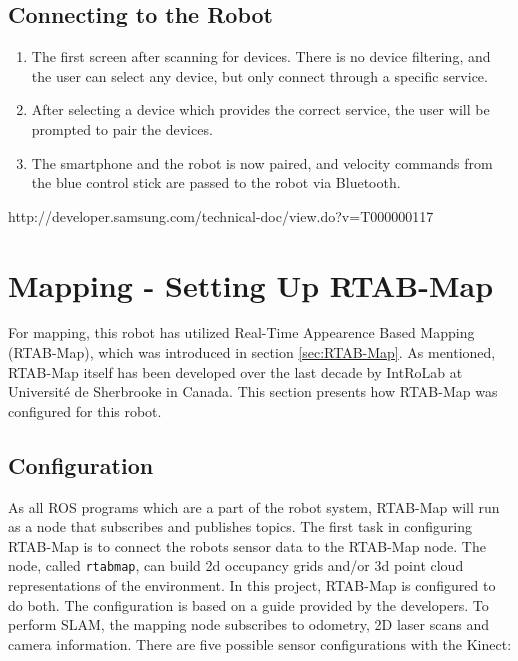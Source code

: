 \subsection{Connecting to the Robot}

\begin{enumerate}
	\item The first screen after scanning for devices. There is no device filtering, and the user can select any device, but only connect through a specific service.
	\item After selecting a device which provides the correct service, the user will be prompted to pair the devices.
	\item The smartphone and the robot is now paired, and velocity commands from the blue control stick are passed to the robot via Bluetooth.
\end{enumerate}

http://developer.samsung.com/technical-doc/view.do?v=T000000117



\section{Mapping - Setting Up RTAB-Map}

For mapping, this robot has utilized Real-Time Appearence Based Mapping (\ac{RTAB-Map}), which was introduced in section \ref{sec:RTAB-Map}. As mentioned, \ac{RTAB-Map} itself has been developed over the last decade by IntRoLab at Université de Sherbrooke in Canada. This section presents how \ac{RTAB-Map} was configured for this robot.

\subsection{Configuration}
\label{sec:configuration}
As all \ac{ROS} programs which are a part of the robot system, \ac{RTAB-Map} will run as a node that subscribes and publishes topics. The first task in configuring \ac{RTAB-Map} is to connect the robots sensor data to the \ac{RTAB-Map} node. The node, called \texttt{rtabmap}, can build 2d occupancy grids and/or 3d point cloud representations of the environment. In this project, \ac{RTAB-Map} is configured to do both. The configuration is based on a guide provided by the developers\cite{rtabmap_setup}. To perform \ac{SLAM}, the mapping node subscribes to odometry, 2D laser scans and camera information. There are five possible sensor configurations with the Kinect\cite{rtabmap_setup}:

